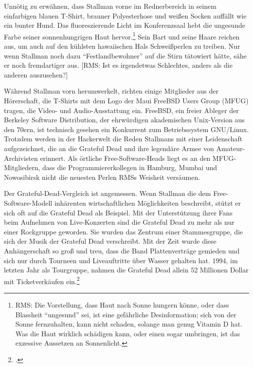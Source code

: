 Unnötig zu erwähnen, dass Stallman vorne im Rednerbereich in seinem einfarbigen blauen T-Shirt, brauner Polyesterhose und weißen Socken auffällt wie ein bunter Hund. Das fluoreszierende Licht im Konferenzsaal hebt die ungesunde Farbe seiner sonnenhungrigen Haut hervor.\footnote{RMS: Die Vorstellung, dass Haut nach Sonne hungern könne, oder dass Blassheit "`ungesund"' sei, ist eine gefährliche Desinformation; sich von der Sonne fernzuhalten, kann nicht schaden, solange man genug Vitamin D hat. Was die Haut wirklich schädigen kann, oder einen sogar umbringen, ist das exzessive Aussetzen an Sonnenlicht.} Sein Bart und seine Haare reichen aus, um auch auf den kühlsten hawaiischen Hals Schweißperlen zu treiben. Nur wenn Stallman noch dazu "`Festlandbewohner"' auf die Stirn tätowiert hätte, sähe er noch fremdartiger aus. [RMS: Ist es irgendetwas Schlechtes, anders als die anderen auszusehen?]

Während Stallman vorn herumwerkelt, richten einige Mitglieder aus der Hörerschaft, die T-Shirts mit dem Logo der Maui FreeBSD Users Group (MFUG) tragen, die Video- und Audio-Ausstattung ein. FreeBSD, ein freier Ableger der Berkeley Software Distribution, der ehrwürdigen akademischen Unix-Version aus den 70ern, ist technisch gesehen ein Konkurrent zum Betriebssystem GNU/Linux. Trotzdem werden in der Hackerwelt die Reden Stallmans mit einer Leidenschaft aufgezeichnet, die an die Grateful Dead und ihre legendäre Armee von Amateur-Archivisten erinnert. Als örtliche Free-Software-Heads liegt es an den MFUG-Mitgliedern, dass die Programmiererkollegen in  Hamburg, Mumbai und Nowosibirsk nicht die neuesten Perlen RMSs Weisheit versäumen.

Der Grateful-Dead-Vergleich ist angemessen. Wenn Stallman die dem Free-Software-Modell inhärenten wirtschaftlichen Möglichkeiten beschreibt, stützt er sich oft auf die Grateful Dead als Beispiel. Mit der Unterstützung ihrer Fans beim Aufnehmen von Live-Konzerten sind die Grateful Dead zu mehr als nur einer Rockgruppe geworden. Sie wurden das Zentrum einer Stammesgruppe, die sich der Musik der Grateful Dead verschreibt. Mit der Zeit wurde diese Anhängerschaft so groß und treu, dass die Band Plattenverträge gemieden und sich nur durch Tourneen und Liveauftritte über Wasser gehalten hat. 1994, im letzten Jahr als Tourgruppe, nahmen die Grateful Dead allein 52 Millionen Dollar mit Ticketverkäufen ein.\footcite[Vgl.][]{gfdgrosses}

